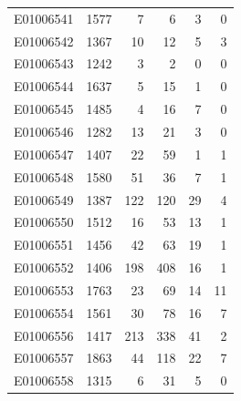 \documentclass[
  letterpaper,
  DIV=11,
  numbers=noendperiod]{scrreprt}
\begin{document}
\begin{tabular}{lrrrrr}
E01006541     &    1577 &       7 &                     6 &                               3 &                       0 \\
E01006542     &    1367 &      10 &                    12 &                               5 &                       3 \\
E01006543     &    1242 &       3 &                     2 &                               0 &                       0 \\
E01006544     &    1637 &       5 &                    15 &                               1 &                       0 \\
E01006545     &    1485 &       4 &                    16 &                               7 &                       0 \\
E01006546     &    1282 &      13 &                    21 &                               3 &                       0 \\
E01006547     &    1407 &      22 &                    59 &                               1 &                       1 \\
E01006548     &    1580 &      51 &                    36 &                               7 &                       1 \\
E01006549     &    1387 &     122 &                   120 &                              29 &                       4 \\
E01006550     &    1512 &      16 &                    53 &                              13 &                       1 \\
E01006551     &    1456 &      42 &                    63 &                              19 &                       1 \\
E01006552     &    1406 &     198 &                   408 &                              16 &                       1 \\
E01006553     &    1763 &      23 &                    69 &                              14 &                      11 \\
E01006554     &    1561 &      30 &                    78 &                              16 &                       7 \\
E01006556     &    1417 &     213 &                   338 &                              41 &                       2 \\
E01006557     &    1863 &      44 &                   118 &                              22 &                       7 \\
E01006558     &    1315 &       6 &                    31 &                               5 &                       0 \\

\end{tabular}
\end{document}
